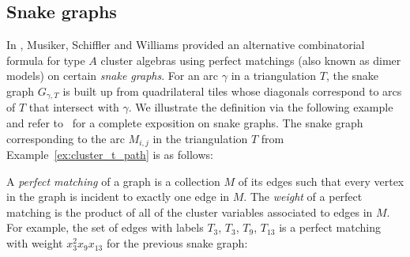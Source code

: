 \documentclass[10pt,a4paper]{amsart}
\numberwithin{equation}{section}
\begin{document}
\subsection{Snake graphs}
In \cite{MSW}, Musiker, Schiffler and Williams provided an alternative combinatorial formula for type $A$ cluster algebras using perfect matchings (also known as dimer models) on certain \emph{snake graphs}.
For an arc $\gamma$ in a triangulation $T$, the snake graph $G_{\gamma, T}$ is built up from quadrilateral tiles whose diagonals correspond to arcs of $T$ that intersect with $\gamma$. We illustrate the definition via the following example and refer to~\cite{MSW} for a complete exposition on snake graphs.
The snake graph corresponding to the arc $M_{i,j}$ in the triangulation $T$ from Example~\ref{ex:cluster_t_path} is as follows:
\begin{center}
\end{center}
A \emph{perfect matching} of a graph is a collection $M$ of its edges such that every vertex in the graph is incident to exactly one edge in $M$. The \emph{weight} of a perfect matching is the product of all of the cluster variables associated to edges in $M$. For example, the set of edges with labels $T_3$, $T_3$, $T_9$, $T_{13}$ is a perfect matching with weight $x_{3}^2x_{9}x_{13}$ for the previous snake graph:
\end{document}
